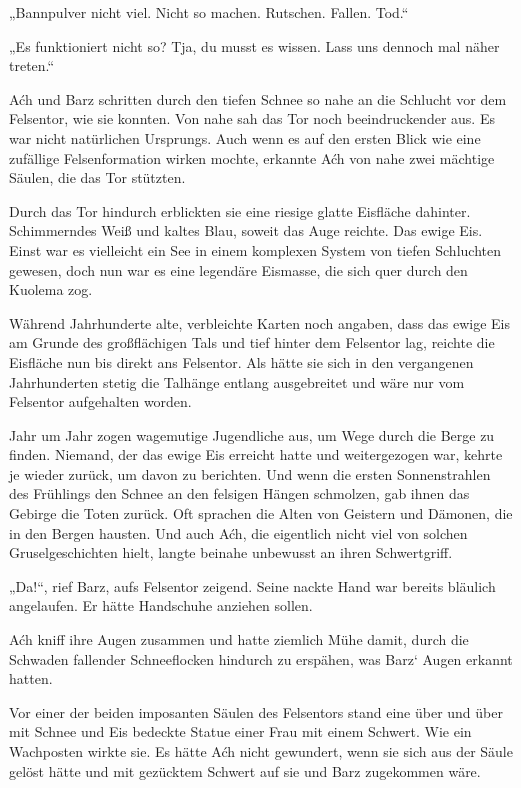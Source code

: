 „Bannpulver nicht viel. Nicht so machen. Rutschen. Fallen. Tod.“

„Es funktioniert nicht so? Tja, du musst es wissen. Lass uns dennoch mal näher treten.“

Aćh und Barz schritten durch den tiefen Schnee so nahe an die Schlucht vor dem Felsentor, wie sie konnten. Von nahe sah das Tor noch beeindruckender aus. Es war nicht natürlichen Ursprungs. Auch wenn es auf den ersten Blick wie eine zufällige Felsenformation wirken mochte, erkannte Aćh von nahe zwei mächtige Säulen, die das Tor stützten.

Durch das Tor hindurch erblickten sie eine riesige glatte Eisfläche dahinter. Schimmerndes Weiß und kaltes Blau, soweit das Auge reichte. Das ewige Eis. Einst war es vielleicht ein See in einem komplexen System von tiefen Schluchten gewesen, doch nun war es eine legendäre Eismasse, die sich quer durch den Kuolema zog.

Während Jahrhunderte alte, verbleichte Karten noch angaben, dass das ewige Eis am Grunde des großflächigen Tals und tief hinter dem Felsentor lag, reichte die Eisfläche nun bis direkt ans Felsentor. Als hätte sie sich in den vergangenen Jahrhunderten stetig die Talhänge entlang ausgebreitet und wäre nur vom Felsentor aufgehalten worden.

Jahr um Jahr zogen wagemutige Jugendliche aus, um Wege durch die Berge zu finden. Niemand, der das ewige Eis erreicht hatte und weitergezogen war, kehrte je wieder zurück, um davon zu berichten. Und wenn die ersten Sonnenstrahlen des Frühlings den Schnee an den felsigen Hängen schmolzen, gab ihnen das Gebirge die Toten zurück. Oft sprachen die Alten von Geistern und Dämonen, die in den Bergen hausten. Und auch Aćh, die eigentlich nicht viel von solchen Gruselgeschichten hielt, langte beinahe unbewusst an ihren Schwertgriff.

„Da!“, rief Barz, aufs Felsentor zeigend. Seine nackte Hand war bereits bläulich angelaufen. Er hätte Handschuhe anziehen sollen.

Aćh kniff ihre Augen zusammen und hatte ziemlich Mühe damit, durch die Schwaden fallender Schneeflocken hindurch zu erspähen, was Barz‘ Augen erkannt hatten.

Vor einer der beiden imposanten Säulen des Felsentors stand eine über und über mit Schnee und Eis bedeckte Statue einer Frau mit einem Schwert. Wie ein Wachposten wirkte sie. Es hätte Aćh nicht gewundert, wenn sie sich aus der Säule gelöst hätte und mit gezücktem Schwert auf sie und Barz zugekommen wäre.

